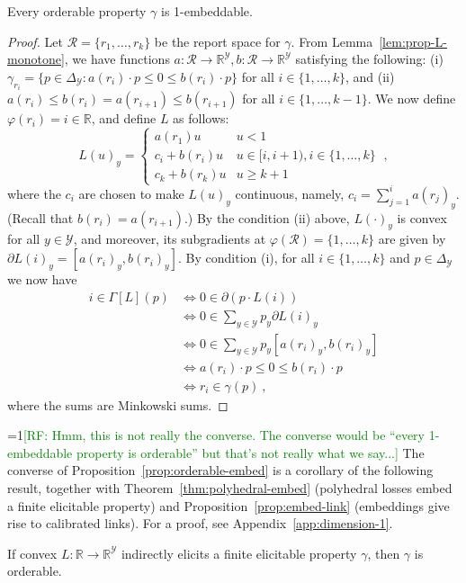 \documentclass[11pt]{colt2019}
\newcommand{\Comments}{1}
\newcommand{\mynote}[2]{\ifnum\Comments=1\textcolor{#1}{#2}\fi}
\newcommand{\raf}[1]{\mynote{green}{[RF: #1]}}
\newcommand{\reals}{\mathbb{R}}
\newcommand{\prop}[1]{\Gamma[#1]}
\newcommand{\simplex}{\Delta_\Y}
\newcommand{\R}{\mathcal{R}}
\newcommand{\Y}{\mathcal{Y}}
\begin{document}
\begin{proposition}\label{prop:orderable-embed}
  Every orderable property $\gamma$ is 1-embeddable.
\end{proposition}
\begin{proof}
  Let $\R = \{r_1,\ldots,r_k\}$ be the report space for $\gamma$.
  From Lemma~\ref{lem:prop-L-monotone}, we have functions $a:\R\to\reals^\Y, b:\R\to\reals^\Y$ satisfying the following: (i) $\gamma_{r_i} = \{p\in\simplex : a(r_i) \cdot p \leq 0 \leq b(r_i) \cdot p\}$ for all $i\in\{1,\ldots,k\}$, and (ii) $a(r_i) \leq b(r_i) = a(r_{i+1}) \leq b(r_{i+1})$ for all $i \in \{1,\ldots,k-1\}$.
  We now define $\varphi(r_i) = i \in \reals$, and define $L$ as follows:
  \begin{equation*}
    L(u)_y =
    \begin{cases}
      a(r_1) u & u < 1 \\
      c_i + b(r_i) u & u \in [i,i+1), i\in\{1,\ldots,k\} \\
      c_k + b(r_k) u & u \geq k+1
    \end{cases}~,
  \end{equation*}
  where the $c_i$ are chosen to make $L(u)_y$ continuous, namely, $c_i = \sum_{j=1}^{i} a(r_j)_y$.
  (Recall that $b(r_i) = a(r_{i+1})$.)
  By the condition (ii) above, $L(\cdot)_y$ is convex for all $y\in\Y$, and moreover, its subgradients at $\varphi(\R) = \{1,\ldots,k\}$ are given by
  $\partial L(i)_y = [a(r_i)_y,b(r_i)_y]$.
  By condition (i), for all $i\in\{1,\ldots,k\}$ and $p\in\simplex$ we now have
  \begin{align*}
    i \in \prop{L}(p)
    &\iff 0 \in \partial (p \cdot L(i)) \\
    &\iff 0 \in \sum_{y\in\Y} p_y \partial L(i)_y \\
    &\iff 0 \in \sum_{y\in\Y} p_y [a(r_i)_y,b(r_i)_y] \\
    &\iff a(r_i) \cdot p \leq 0 \leq b(r_i) \cdot p \\
    &\iff r_i \in \gamma(p)~,
  \end{align*}
  where the sums are Minkowski sums.
\end{proof}

\raf{Hmm, this is not really the converse.  The converse would be ``every 1-embeddable property is orderable'' but that's not really what we say...}
The converse of Proposition~\ref{prop:orderable-embed} is a corollary of the following result, together with Theorem~\ref{thm:polyhedral-embed} (polyhedral losses embed a finite elicitable property) and Proposition~\ref{prop:embed-link} (embeddings give rise to calibrated links).
For a proof, see Appendix~\ref{app:dimension-1}.
\begin{proposition}\label{prop:indirect-orderable}
  If convex $L : \reals \to \reals^\Y$ indirectly elicits a finite elicitable property $\gamma$, then $\gamma$ is orderable.
\end{proposition}
\end{document}

